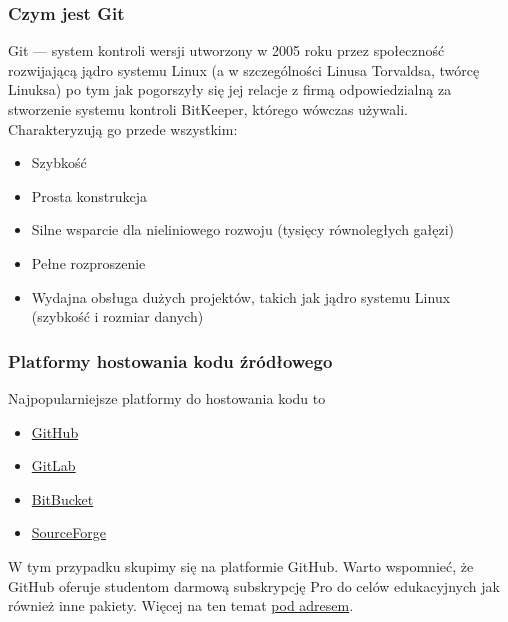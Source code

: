 \subsubsection[Czym jest Git]{Czym jest Git~\cite{ProGit}}
Git — system kontroli wersji utworzony w 2005 roku przez społeczność rozwijającą jądro systemu Linux (a w szczególności Linusa Torvaldsa, twórcę Linuksa)
po tym jak pogorszyły się jej relacje z firmą odpowiedzialną za stworzenie systemu kontroli BitKeeper, którego wówczas używali.
\\
Charakteryzują go przede wszystkim:
\begin{itemize}
  \item Szybkość
  \item Prosta konstrukcja
  \item Silne wsparcie dla nieliniowego rozwoju (tysięcy równoległych gałęzi)
  \item Pełne rozproszenie
  \item Wydajna obsługa dużych projektów, takich jak jądro systemu Linux (szybkość i rozmiar danych)
\end{itemize}

\subsubsection{Platformy hostowania kodu źródłowego}
Najpopularniejsze platformy do hostowania kodu to
\begin{itemize}
  \item \href{https://github.com/}{GitHub}
  \item \href{https://about.gitlab.com/}{GitLab}
  \item \href{https://bitbucket.org/product}{BitBucket}
  \item \href{https://sourceforge.net/}{SourceForge}
\end{itemize}

W tym przypadku skupimy się na platformie GitHub. Warto wspomnieć, że GitHub oferuje studentom darmową subskrypcję Pro do celów edukacyjnych jak również inne pakiety. Więcej na ten temat \href{https://education.github.com/students}{pod adresem}.
